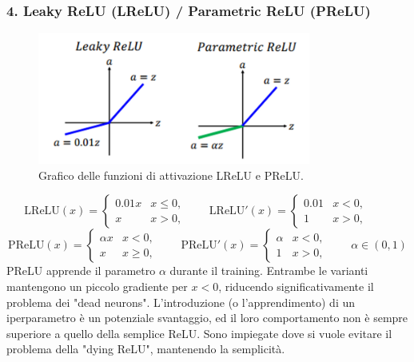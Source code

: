 \documentclass[a4paper,12pt]{report}
\begin{document}
	\subsubsection{4. Leaky ReLU (LReLU) / Parametric ReLU (PReLU)}
	\begin{figure}[H]
		\centering
		\includegraphics[width=0.8\textwidth]{img/lprelu.png}
		\caption{Grafico delle funzioni di attivazione LReLU e PReLU.}
	\end{figure}
	\[
	\mathrm{LReLU}(x)=\begin{cases}0.01x & x\le0,\\ x & x>0,\end{cases}\qquad
	\mathrm{LReLU}'(x)=\begin{cases}0.01 & x<0,\\ 1 & x>0,\end{cases}\qquad
	\]
	\[
	\mathrm{PReLU}(x)=\begin{cases}\alpha x & x<0,\\ x & x\ge0,\end{cases}\qquad
	\mathrm{PReLU}'(x)=\begin{cases}\alpha & x<0,\\ 1 & x>0,\end{cases}\qquad \alpha\in(0,1)
	\]
	PReLU apprende il parametro $\alpha$ durante il training. Entrambe le varianti mantengono un piccolo gradiente per $x<0$, riducendo significativamente il problema dei "dead neurons". L'introduzione (o l'apprendimento) di un iperparametro è un potenziale svantaggio, ed il loro comportamento non è sempre superiore a quello della semplice ReLU. Sono impiegate dove si vuole evitare il problema della "dying ReLU", mantenendo la semplicità.
	
\end{document}
